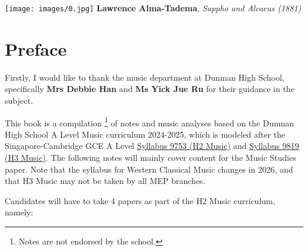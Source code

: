 \begin{titlepage}

    \maketitle
    \setcounter{page}{0}
    \begin{center}
        \vspace*{\fill}
    \texttt{[image: images/0.jpg]}
    \vspace{10mm}
    \hspace{2px}\small{\sffamily\textbf{Lawrence Alma-Tadema}, \textit{Sappho and Alcaeus (1881)}}
    \vspace{10mm}
    \vspace*{\fill}
    \end{center}
    \chapter*{Preface}
    Firstly, I would like to thank the music department at Dunman High School, specifically \textbf{Mrs Debbie Han} and \textbf{Ms Yick Jue Ru} for their guidance in the subject.
    
    This book is a compilation \thanks{Notes are not endorsed by the school.} of notes and music analyses based on the Dunman High School A Level Music curriculum 2024-2025, which is modeled after the Singapore-Cambridge GCE A Level \href{https://www.seab.gov.sg/files/A%20Level%20Syllabus%20Sch%20Cddts/2025/9753_y25_sy.pdf}{Syllabus 9753 (H2 Music)} and \href{https://www.seab.gov.sg/files/A%20Level%20Syllabus%20Sch%20Cddts/2025/9819_y25_sy.pdf}{Syllabus 9819 (H3 Music)}. The following notes will mainly cover content for the Music Studies paper. Note that the syllabus for Western Classical Music changes in 2026, and that H3 Music may not be taken by all MEP branches. 
    
    \noindent Candidates will have to take 4 papers as part of the H2 Music curriculum, namely:
    

\end{titlepage}
